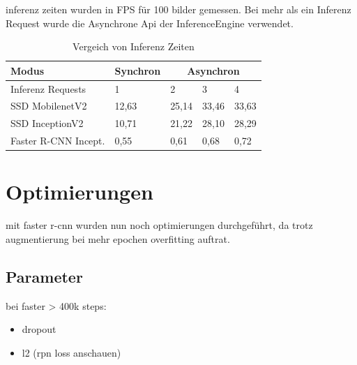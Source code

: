 inferenz zeiten wurden in FPS für 100 bilder gemessen. Bei 
mehr als ein Inferenz Request wurde die Asynchrone Api der InferenceEngine 
verwendet.


\begin{table}[htb]
  \centering
  \label{table:infer_zeit}
  \begin{tabular}{m{}|m{}<{\centering}|m{}<{\centering}|m{}<{\centering}|m{}<{\centering}}
  \hline
  Modus                & Synchron & \multicolumn{3}{c}{Asynchron} \\ \hline
  Inferenz Requests    & 1        & 2        & 3        & 4        \\ \hline\hline
  SSD MobilenetV2      & 12,63    & 25,14    & 33,46    & 33,63    \\
  SSD InceptionV2      & 10,71    & 21,22    & 28,10    & 28,29    \\
  Faster R-CNN Incept. & 0,55     & 0,61     & 0,68     & 0,72     \\ \hline
  \end{tabular}
  \caption{Vergeich von Inferenz Zeiten}
\end{table}


\section{Optimierungen}
mit faster r-cnn wurden nun noch optimierungen durchgeführt, da 
trotz augmentierung bei mehr epochen overfitting auftrat.

\subsection{Parameter}
bei faster > 400k steps:
\begin{itemize}
  \item dropout
  \item l2 (rpn loss anschauen)
\end{itemize}

